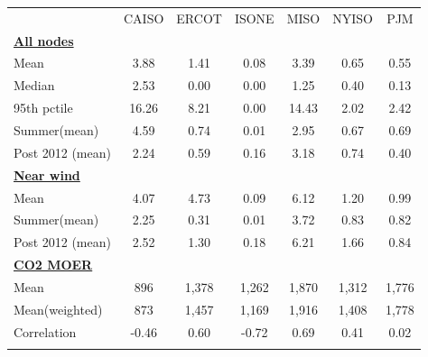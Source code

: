 \begin{center}
\begin{tabular}{lcccccc}
\hline \noalign{\smallskip} & CAISO & ERCOT & ISONE & MISO & NYISO & PJM\\
\noalign{\smallskip}\hline \textbf{\underline{All nodes}} &  &  &  &  &  & \\
Mean & 3.88 & 1.41 & 0.08 & 3.39 & 0.65 & 0.55\\
Median & 2.53 & 0.00 & 0.00 & 1.25 & 0.40 & 0.13\\
95th pctile & 16.26 & 8.21 & 0.00 & 14.43 & 2.02 & 2.42\\
\noalign{\smallskip}Summer(mean) & 4.59 & 0.74 & 0.01 & 2.95 & 0.67 & 0.69\\
Post 2012 (mean) & 2.24 & 0.59 & 0.16 & 3.18 & 0.74 & 0.40\\
\textbf{\underline{Near wind}} &  &  &  &  &  & \\
\noalign{\smallskip}Mean & 4.07 & 4.73 & 0.09 & 6.12 & 1.20 & 0.99\\
Summer(mean) & 2.25 & 0.31 & 0.01 & 3.72 & 0.83 & 0.82\\
Post 2012 (mean) & 2.52 & 1.30 & 0.18 & 6.21 & 1.66 & 0.84\\
\textbf{\underline{CO2 MOER}} &  &  &  &  &  & \\
\noalign{\smallskip}Mean & 896 & 1,378 & 1,262 & 1,870 & 1,312 & 1,776\\
Mean(weighted) & 873 & 1,457 & 1,169 & 1,916 & 1,408 & 1,778\\
Correlation & -0.46 & 0.60 & -0.72 & 0.69 & 0.41 & 0.02\\
\noalign{\smallskip}\hline\end{tabular}\\
\end{center}
